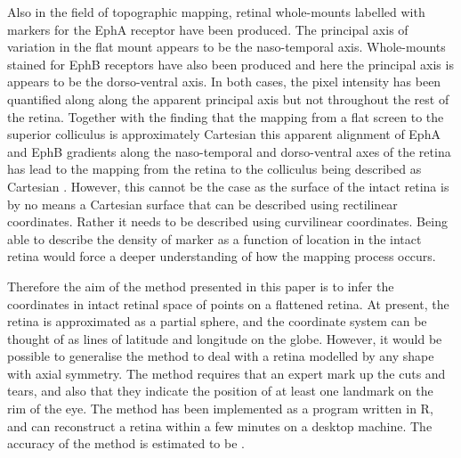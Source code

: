 \documentclass[10pt]{article}
\begin{document}
Also in the field of topographic mapping, retinal whole-mounts
labelled with markers for the EphA receptor \cite{ChenEtal95comp} have
been produced. The principal axis of variation in the flat mount
appears to be the naso-temporal axis.  Whole-mounts stained for EphB
receptors have also been produced \cite{BirgEtal00kina} and here the
principal axis is appears to be the dorso-ventral axis. In both cases,
the pixel intensity has been quantified along along the apparent
principal axis but not throughout the rest of the retina.  Together
with the finding that the mapping from a flat screen to the superior
colliculus is approximately Cartesian \cite{DragHube76topo} this
apparent alignment of EphA and EphB gradients along the naso-temporal
and dorso-ventral axes of the retina has lead to the mapping from the
retina to the colliculus being described as Cartesian
\cite{BeviEtal11gene}. However, this cannot be the case as the surface
of the intact retina is by no means a Cartesian surface that can be
described using rectilinear coordinates.  Rather it needs to be
described using curvilinear coordinates. Being able to describe the
density of marker as a function of location in the intact retina would
force a deeper understanding of how the mapping process occurs.


Therefore the aim of the method presented in this paper is to infer
the coordinates in intact retinal space of points on a flattened
retina. At present, the retina is approximated as a partial sphere,
and the coordinate system can be thought of as lines of latitude and
longitude on the globe. However, it would be possible to generalise
the method to deal with a retina modelled by any shape with axial
symmetry. The method requires that an expert mark up the cuts and
tears, and also that they indicate the position of at least one
landmark on the rim of the eye. The method has been implemented as a
program written in R, and can reconstruct a retina within a few
minutes on a desktop machine. The accuracy of the method is estimated
to be .
\end{document}
